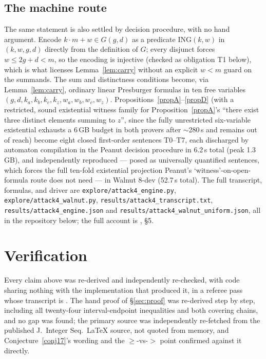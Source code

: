 \documentclass[10pt,reqno]{amsart}
\theoremstyle{plain}
\theoremstyle{definition}
\theoremstyle{remark}
\numberwithin{theorem}{section}
\newcommand{\G}{G}
\begin{document}
\subsection*{The machine route}
The same statement is also settled by decision procedure, with no hand argument. Encode
$k\cdot m+w \in \G(g,d)$ as a predicate $\mathrm{ING}(k,w)$ in $(k,w,g,d)$ directly from the
definition of $\G$; every disjunct forces $w\le 2g+d<m$, so the encoding is injective (checked
as obligation T1 below), which is what licenses Lemma~\ref{lem:carry} without an explicit
$w<m$ guard on the summands. The sum and distinctness conditions become, via
Lemma~\ref{lem:carry}, ordinary linear Presburger formulas in ten free variables
$(g,d,k_a,k_b,k_c,k_z,w_a,w_b,w_c,w_z)$. Propositions~\ref{propA}--\ref{propD} (with a
restricted, sound existential witness family for Proposition~\ref{propA}'s ``there exist
three distinct elements summing to $z$'', since the fully unrestricted six-variable
existential exhausts a 6\,GB budget in both provers after $\sim$280\,s and remains out of
reach) become eight closed first-order sentences T0--T7, each discharged by automaton
compilation in the Peanut decision procedure in 6.2\,s total (peak 1.3\,GB), and independently
reproduced --- posed as universally quantified sentences, which forces the full ten-fold
existential projection Peanut's `witness'-on-open-formula route does not need --- in Walnut
8-dev (52.7\,s total). The full transcript, formulas, and driver are
\texttt{explore/attack4\_engine.py}, \texttt{explore/attack4\_walnut.py},
\texttt{results/attack4\_transcript.txt}, \texttt{results/attack4\_engine.json} and
\texttt{results/attack4\_walnut\_uniform.json}, all in the repository below; the full account
is \cite{Attack4}, \S5.

\section{Verification}
\label{sec:verify}

Every claim above was re-derived and independently re-checked, with code sharing nothing with
the implementation that produced it, in a referee pass whose transcript is \cite{Verdict}. The
hand proof of \S\ref{sec:proof} was re-derived step by step, including all twenty-four
interval-endpoint inequalities and both covering chains, and no gap was found; the primary
source \cite{Fokkink} was independently re-fetched from the published J.\ Integer Seq.\ LaTeX
source, not quoted from memory, and Conjecture~\ref{conj17}'s wording and the $\ge$-vs-$>$
point confirmed against it directly.
\end{document}

